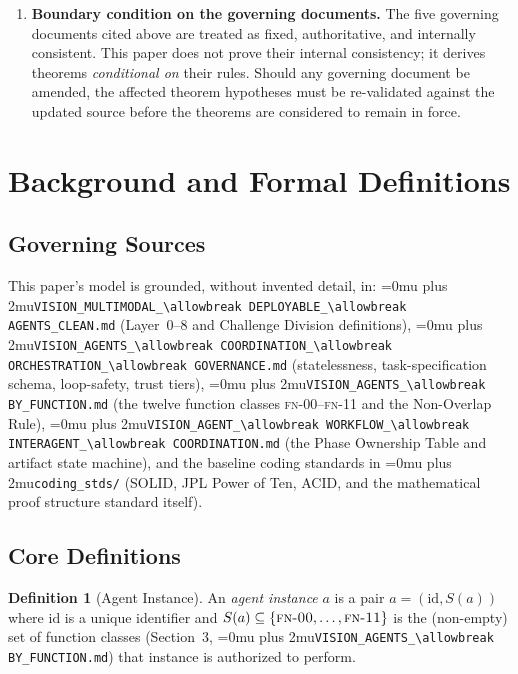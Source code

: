 \documentclass[12pt]{article}
\theoremstyle{definition}
\newtheorem{definition}[theorem]{Definition}
\DeclareRobustCommand{\code}[1]{\begingroup\Urlmuskip=0mu plus 2mu\relax\nolinkurl{#1}\endgroup}
\newcommand{\FN}[1]{\textsc{fn-#1}}
\newcommand{\VisionClean}{\code{VISION\_MULTIMODAL\_\allowbreak DEPLOYABLE\_\allowbreak AGENTS\_CLEAN.md}}
\newcommand{\VisionGov}{\code{VISION\_AGENTS\_\allowbreak COORDINATION\_\allowbreak ORCHESTRATION\_\allowbreak GOVERNANCE.md}}
\newcommand{\VisionFunc}{\code{VISION\_AGENTS\_\allowbreak BY\_FUNCTION.md}}
\newcommand{\VisionFlow}{\code{VISION\_AGENT\_\allowbreak WORKFLOW\_\allowbreak INTERAGENT\_\allowbreak COORDINATION.md}}
\begin{document}
\begin{enumerate}
    \item \textbf{Boundary condition on the governing documents.}
          The five governing documents cited above are treated as fixed,
          authoritative, and internally consistent.
          This paper does not prove their internal consistency; it
          derives theorems \emph{conditional on} their rules.
          Should any governing document be amended, the affected theorem
          hypotheses must be re-validated against the updated source
          before the theorems are considered to remain in force.

\end{enumerate}

\section{Background and Formal Definitions}
\label{sec:background}

\subsection{Governing Sources}
\begin{sloppypar}
This paper's model is grounded, without invented detail, in:
\VisionClean{} (Layer~0--8 and
Challenge Division definitions), \VisionGov{} (statelessness, task-specification
schema, loop-safety, trust tiers), \VisionFunc{}
(the twelve function classes \FN{00}--\FN{11} and the Non-Overlap Rule),
\VisionFlow{} (the Phase
Ownership Table and artifact state machine), and the baseline coding
standards in \code{coding\_stds/} (SOLID, JPL Power of Ten, ACID, and the
mathematical proof structure standard itself).
\end{sloppypar}

\subsection{Core Definitions}

\begin{definition}[Agent Instance]
\label{def:agent}
An \emph{agent instance} $a$ is a pair $a = (\mathrm{id}, S(a))$ where
$\mathrm{id}$ is a unique identifier and $S(a) \subseteq
\{\FN{00},\ldots,\FN{11}\}$ is the (non-empty) set of function classes
(Section~3, \VisionFunc{}) that instance is
authorized to perform.
\end{definition}
\end{document}
